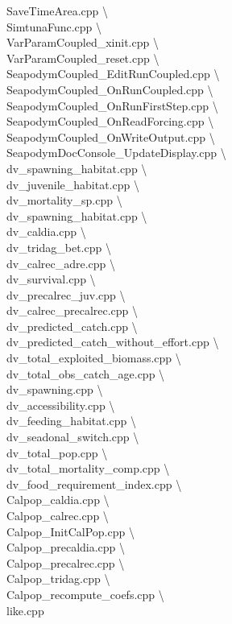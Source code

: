 SaveTimeArea.cpp \textbackslash \\
SimtunaFunc.cpp \textbackslash \\
VarParamCoupled\_xinit.cpp \textbackslash \\
VarParamCoupled\_reset.cpp \textbackslash \\
SeapodymCoupled\_EditRunCoupled.cpp \textbackslash \\
SeapodymCoupled\_OnRunCoupled.cpp \textbackslash \\
SeapodymCoupled\_OnRunFirstStep.cpp \textbackslash \\
SeapodymCoupled\_OnReadForcing.cpp \textbackslash \\
SeapodymCoupled\_OnWriteOutput.cpp \textbackslash \\
SeapodymDocConsole\_UpdateDisplay.cpp \textbackslash \\
dv\_spawning\_habitat.cpp \textbackslash \\
dv\_juvenile\_habitat.cpp \textbackslash \\
dv\_mortality\_sp.cpp \textbackslash \\
dv\_spawning\_habitat.cpp \textbackslash \\
dv\_caldia.cpp \textbackslash \\
dv\_tridag\_bet.cpp \textbackslash \\
dv\_calrec\_adre.cpp \textbackslash \\
dv\_survival.cpp \textbackslash \\
dv\_precalrec\_juv.cpp \textbackslash \\
dv\_calrec\_precalrec.cpp \textbackslash \\
dv\_predicted\_catch.cpp \textbackslash \\
dv\_predicted\_catch\_without\_effort.cpp \textbackslash \\
dv\_total\_exploited\_biomass.cpp \textbackslash \\
dv\_total\_obs\_catch\_age.cpp \textbackslash \\
dv\_spawning.cpp \textbackslash \\
dv\_accessibility.cpp \textbackslash \\
dv\_feeding\_habitat.cpp \textbackslash \\
dv\_seadonal\_switch.cpp \textbackslash \\
dv\_total\_pop.cpp \textbackslash \\
dv\_total\_mortality\_comp.cpp \textbackslash \\
dv\_food\_requirement\_index.cpp \textbackslash \\
Calpop\_caldia.cpp  \textbackslash \\
Calpop\_calrec.cpp  \textbackslash \\
Calpop\_InitCalPop.cpp  \textbackslash \\
Calpop\_precaldia.cpp  \textbackslash \\
Calpop\_precalrec.cpp  \textbackslash \\
Calpop\_tridag.cpp \textbackslash \\
Calpop\_recompute\_coefs.cpp \textbackslash \\
like.cpp \\

